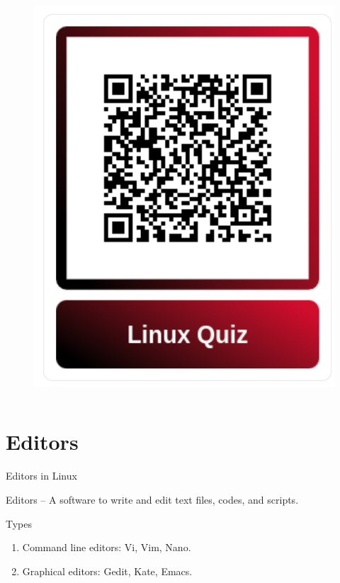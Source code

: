 \documentclass[aspectratio=169]{beamer}
\begin{document}
\begin{frame}
\begin{columns}
\begin{column}{0.4\textwidth}
\begin{figure}[htpb]
\begin{center}
                    \includegraphics[keepaspectratio, scale=0.25]{pic/linux_quiz_qr.png}
                \end{center}
            \end{figure}
        \end{column}
    \end{columns}
\end{frame}

\section{Editors}

\begin{frame}{Editors in Linux}
    \begin{block}{Editors}
        -- A software to write and edit text files, codes, and scripts.
    \end{block}

    \begin{block}{Types}
        \begin{enumerate}
            \item Command line editors: Vi, Vim, Nano.
            \item Graphical editors: Gedit, Kate, Emacs.
        \end{enumerate}
    \end{block}
\end{frame}
\end{document}
